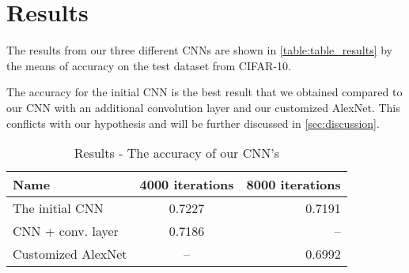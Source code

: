 \graphicspath{{Chapters/Project/}}

\section{Results} %
\label{sec:results}

The results from our three different CNNs are shown in
\autoref{table:table_results} by the means of accuracy on the test dataset from
CIFAR-10. 

The accuracy for the initial CNN is the best result that we obtained
compared to our CNN with an additional convolution layer and our customized
AlexNet. This conflicts with our hypothesis and will be further discussed in
\autoref{sec:discussion}.

\vspace{3 mm} %
\begin{table}[H]
\centering
\sffamily
\small
\begin{tabular}{l | c r}
\toprule
Name 					& 4000 iterations		& 8000 iterations	\\
\midrule 
The initial CNN 		& 0.7227				& 0.7191			\\ 
CNN + conv. layer		& 0.7186				& --				\\ 
Customized AlexNet		& -- 					& 0.6992	 		\\ 
\bottomrule 
\end{tabular}
\caption[Short caption]{Results - The accuracy of our CNN's}
\label{table:table_results}
\end{table}





